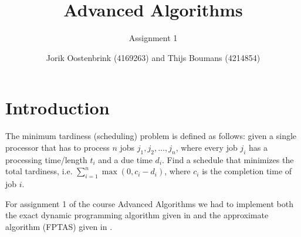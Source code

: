 \documentclass[a4paper,11pt]{article}
\title{Advanced Algorithms}
\subtitle{Assignment 1}
\author{Jorik Oostenbrink (4169263) and Thijs Boumans (4214854)}
\date{}
\begin{document}
	
\maketitle

\section{Introduction}
The minimum tardiness (scheduling) problem is defined as follows: given a single processor that has to process $n$ jobs $j_1,j_2,\dots,j_n$, where every job $j_i$ has a processing time/length $t_i$ and a due time $d_i$. Find a schedule that minimizes the total tardiness, i.e. $\sum_{i=1}^{n}{\max(0,c_i - d_i)}$, where $c_i$ is the completion time of job $i$.

For assignment 1 of the course Advanced Algorithms we had to implement both the exact dynamic programming algorithm given in \cite{exact} and the approximate algorithm (FPTAS) given in \cite{approx}.
	


\end{document}
